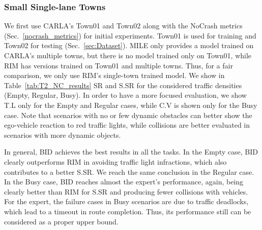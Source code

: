 \subsubsection{Small Single-lane Towns} \label{sec:small_town_results}

\hspace{1pc}We first use CARLA's Town01 and Town02 along with the NoCrash metrics (Sec.~\ref{nocrash_metrics}) for initial experiments. 
Town01 is used for training and Town02 for testing (Sec.~\ref{sec:Dataset}). 
MILE only provides a model trained on CARLA's multiple towns, but there is no model trained only on Town01, while RIM has versions trained on Town01 and multiple towns. 
Thus, for a fair comparison, we only use RIM's single-town trained model. 
We show in Table~\ref{tab:T2_NC_results} SR and S.SR for the considered traffic densities (Empty, Regular, Busy). 
In order to have a more focused evaluation, we show T.L only for the Empty and Regular cases, while C.V is shown only for the Busy case. 
Note that scenarios with no or few dynamic obstacles can better show the ego-vehicle reaction to red traffic lights, while collisions are better evaluated in scenarios with more dynamic objects. 


In general, BID achieves the best results in all the tasks. 
In the Empty case, BID clearly outperforms RIM in avoiding traffic light infractions, which also contributes to a better S.SR. 
We reach the same conclusion in the Regular case. 
In the Busy case, BID reaches almost the expert's performance, again, being clearly better than RIM for S.SR and producing fewer collisions with vehicles. 
For the expert, the failure cases in Busy scenarios are due to traffic deadlocks, which lead to a timeout in route completion. 
Thus, its performance still can be considered as a proper upper bound. 




